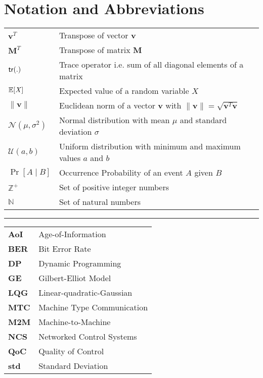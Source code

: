 \chapter*{Notation and Abbreviations}

\begin{tabular}{p{2cm} l} 
$\boldsymbol{v}^T$ & Transpose of vector $\boldsymbol{v}$\\
$\boldsymbol{M}^T$ & Transpose of matrix $\boldsymbol{M}$\\
$\mathsf{tr}(.)$ & Trace operator i.e. sum of all diagonal elements of a matrix\\
$\mathbb{E}[\mathit{X}]$ & Expected value of a random variable $\mathit{X}$\\
$\|\boldsymbol{v}\|$ & Euclidean norm of a vector $\boldsymbol{v}$ with $\|\boldsymbol{v}\|=\sqrt{\boldsymbol{v} ^T\boldsymbol{v}}$\\
$\mathcal{N}(\mu,\sigma^2)$ & Normal distribution with mean $\mu$ and standard deviation $\sigma$\\
$\mathcal{U}(a,b)$ & Uniform distribution with minimum and maximum values $a$ and $b$\\
$\Pr\left[A \mid B \right]$ & Occurrence Probability of an event $A$ given $B$\\
$\mathbb{Z}^+$ & Set of positive integer numbers\\
$\mathbb{N}$ & Set of natural numbers\\
\end{tabular}
\vspace{1cm}

\hrule
\vspace{1cm}
  
\begin{tabular}{>{\bfseries}p{2cm} l}
AoI & Age-of-Information\\
BER & Bit Error Rate\\
DP & Dynamic Programming\\
GE & Gilbert-Elliot Model\\
LQG & Linear-quadratic-Gaussian\\
MTC & Machine Type Communication\\
M2M & Machine-to-Machine\\
NCS & Networked Control Systems\\
QoC & Quality of Control\\
std & Standard Deviation\\
\end{tabular}
